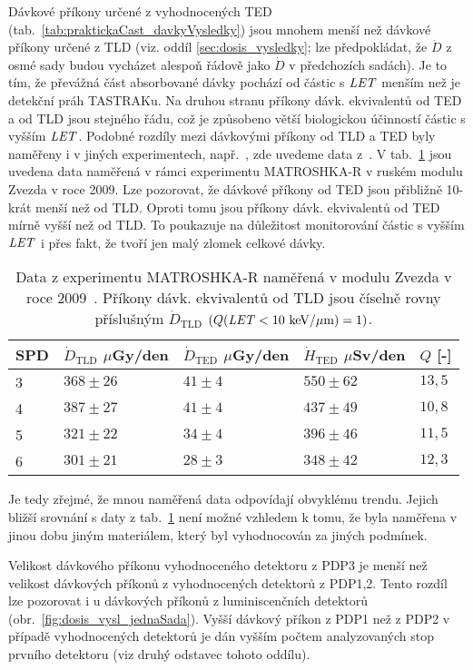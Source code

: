Dávkové příkony určené z vyhodnocených TED (tab.~\ref{tab:praktickaCast_davkyVysledky}) jsou mnohem menší než dávkové příkony určené z TLD (viz. oddíl \ref{sec:dosis_vysledky}; lze předpokládat, že $\dot{D}$ z osmé sady budou vycházet alespoň řádově jako $\dot{D}$ v předchozích sadách). Je to tím, že převážná část absorbované dávky pochází od částic s $\mathit{LET}$ menším než je detekční práh TASTRAKu. Na druhou stranu příkony dávk. ekvivalentů od TED a od TLD jsou stejného řádu, což je způsobeno větší biologickou účinností částic s vyšším $\mathit{LET}$. Podobné rozdíly mezi dávkovými příkony od TLD a TED byly naměřeny i v jiných experimentech, např.~\cite{passDetectors,ambrozova_dvaExperimenty, japonsky}, zde uvedeme data z~\cite{passDetectors}. V tab.~\ref{tab:praktickaCast_rozdilyJinyExp} jsou uvedena data naměřená v rámci experimentu MATROSHKA-R v
ruském modulu Zvezda v roce 2009. Lze pozorovat, že dávkové příkony od TED jsou přibližně 10-krát menší než od TLD. Oproti tomu jsou příkony dávk. ekvivalentů od TED mírně vyšší než od TLD. To poukazuje na důležitost monitorování částic s vyšším $\mathit{LET}$ i přes fakt, že tvoří jen malý zlomek celkové dávky.
\begin{table}[h]
  \centering
  \begin{tabular}{lllll}
	\toprule
	SPD&$\dot{D}_{\text{TLD}}$ $\mu$Gy/den&$\dot{D}_{\text{TED}}$ $\mu$Gy/den&$\dot{H}_{\text{TED}}$ $\mu$Sv/den&$Q$ [-]\\
	\midrule
	3&$368\pm26$&$41\pm4$&$550\pm62$&$13,5$\\
	4&$387\pm27$&$41\pm4$&$437\pm49$&$10,8$\\
	5&$321\pm22$&$34\pm4$&$396\pm46$&$11,5$\\
	6&$301\pm21$&$28\pm3$&$348\pm42$&$12,3$\\
	\bottomrule
  \end{tabular}
  \caption{Data z experimentu MATROSHKA-R naměřená v modulu Zvezda v roce 2009~\cite{passDetectors}. Příkony dávk. ekvivalentů od TLD jsou číselně rovny příslušným $\dot{D}_{\text{TLD}}$ $(Q(\mathit{LET}<\nobreak10\ \mathrm{keV/\mu m})=1)$.}
  \label{tab:praktickaCast_rozdilyJinyExp}
\end{table}
Je tedy zřejmé, že mnou naměřená data odpovídají obvyklému trendu. Jejich bližší srovnání s daty z tab.~\ref{tab:praktickaCast_rozdilyJinyExp} není možné vzhledem k tomu, že byla naměřena v jinou dobu jiným materiálem, který byl vyhodnocován za jiných podmínek. 

Velikost dávkového příkonu vyhodnoceného detektoru z PDP3 je menší než velikost dávkových příkonů z vyhodnocených detektorů z PDP1,2. Tento rozdíl lze pozorovat i u dávkových příkonů z luminiscenčních detektorů (obr.~\ref{fig:dosis_vysl_jednaSada}). Vyšší dávkový příkon z PDP1 než z PDP2 v případě vyhodnocených detektorů je dán vyšším počtem analyzovaných stop prvního detektoru (viz druhý odstavec tohoto oddílu).

